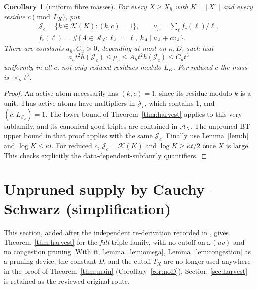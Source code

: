 \documentclass[10pt,reqno]{amsart}
\newtheorem{corollary}[theorem]{Corollary}
\theoremstyle{remark}
\newcommand{\K}{\mathcal K}
\newcommand{\J}{\mathcal J}
\newcommand{\A}{\mathcal A}
\begin{document}
\begin{corollary}[uniform fibre masses]\label{cor:fibremass}
For every $X\geq X_h$ with $K=\lfloor X^\kappa\rfloor$ and every residue
$c\pmod{L_K}$, put
\[
 \begin{gathered}
 \J_c=\{k\in\K(K):(k,c)=1\},\qquad\mu_c=\sum_\ell f_c(\ell)/\ell,\\
 f_c(\ell)=\#\{A\in\A_X:\ell_A=\ell,\ k_A\mid u_A+cv_A\}.
 \end{gathered}
\]
There are constants $a_h,C_u>0$, depending at most on $\kappa,D$, such that
\begin{equation}\label{eq:fibremass}
 a_ht^2h(\J_c)\leq\mu_c\leq A_ht^2h(\J_c)\leq C_ut^3
\end{equation}
uniformly in \emph{all} $c$, not only reduced residues modulo $L_K$.
For reduced $c$ the mass is $\asymp_\kappa t^3$.
\end{corollary}
\begin{proof}
An active atom necessarily has $(k,c)=1$, since its residue modulo $k$ is
a unit.  Thus active atoms have multipliers in $\J_c$, which contains 1,
and $(c,L_{\J_c})=1$.  The lower bound of Theorem~\ref{thm:harvest}
applies to this very subfamily, and its canonical good triples are contained
in $\A_X$.  The unpruned BT upper bound in that proof applies with the
same $\J_c$.  Finally use Lemma~\ref{lem:h} and $\log K\leq\kappa t$.
For reduced $c$, $\J_c=\K(K)$ and $\log K\geq\kappa t/2$ once $X$ is
large.  This checks explicitly the data-dependent-subfamily quantifiers.
\end{proof}


\section{Unpruned supply by Cauchy--Schwarz (simplification)}\label{sec:unpruned}
This section, added after the independent re-derivation recorded in
\cite[\S76]{Notes}, gives Theorem~\ref{thm:harvest} for the
\emph{full} triple family, with no cutoff on $\omega(uv)$ and no
congestion pruning.  With it, Lemma~\ref{lem:omega}, Lemma~\ref{lem:congestion}
as a pruning device, the constant $D$, and the cutoff $T_X$ are no
longer used anywhere in the proof of Theorem~\ref{thm:main}
(Corollary~\ref{cor:noD}).  Section~\ref{sec:harvest} is retained as
the reviewed original route.
\end{document}
